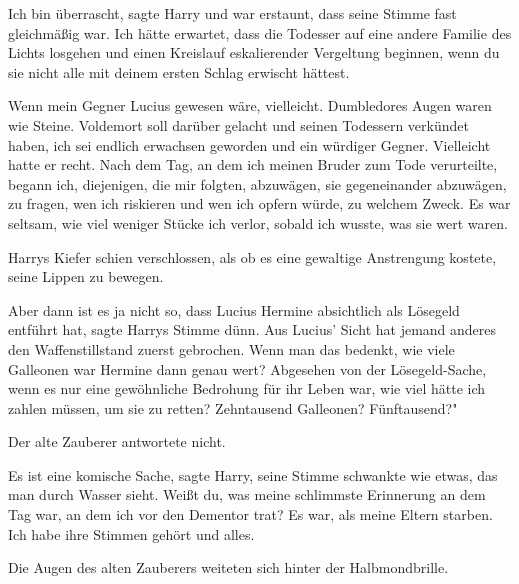 \glqq{}Ich bin überrascht\grqq{}, sagte Harry und war erstaunt, dass seine Stimme
fast gleichmäßig war. \glqq{}Ich hätte erwartet, dass die Todesser auf eine
andere Familie des Lichts losgehen und einen Kreislauf eskalierender Vergeltung
beginnen, wenn du sie nicht alle mit deinem ersten Schlag erwischt
hättest.\grqq{}

\glqq{}Wenn mein Gegner Lucius gewesen wäre, vielleicht.\grqq{} Dumbledores Augen
waren wie Steine. \glqq{}Voldemort soll darüber gelacht und seinen Todessern
verkündet haben, ich sei endlich erwachsen geworden und ein würdiger Gegner.
Vielleicht hatte er recht. Nach dem Tag, an dem ich meinen Bruder zum Tode
verurteilte, begann ich, diejenigen, die mir folgten, abzuwägen, sie
gegeneinander abzuwägen, zu fragen, wen ich riskieren und wen ich opfern würde,
zu welchem Zweck. Es war seltsam, wie viel weniger Stücke ich verlor, sobald ich
wusste, was sie wert waren.\grqq{}

Harrys Kiefer schien verschlossen, als ob es eine gewaltige Anstrengung kostete,
seine Lippen zu bewegen.

\glqq{}Aber dann ist es ja nicht so, dass Lucius Hermine absichtlich als Lösegeld
entführt hat\grqq{}, sagte Harrys Stimme dünn. \glqq{}Aus Lucius' Sicht hat
jemand anderes den Waffenstillstand zuerst gebrochen. Wenn man das bedenkt, wie
viele Galleonen war Hermine dann genau wert? Abgesehen von der Lösegeld-Sache,
wenn es nur eine gewöhnliche Bedrohung für ihr Leben war, wie viel hätte ich
zahlen müssen, um sie zu retten? Zehntausend Galleonen? Fünftausend?"

Der alte Zauberer antwortete nicht.

\glqq{}Es ist eine komische Sache\grqq{}, sagte Harry, seine Stimme schwankte wie
etwas, das man durch Wasser sieht. \glqq{}Weißt du, was meine schlimmste
Erinnerung an dem Tag war, an dem ich vor den Dementor trat? Es war, als meine
Eltern starben. Ich habe ihre Stimmen gehört und alles.\grqq{}

Die Augen des alten Zauberers weiteten sich hinter der Halbmondbrille.

